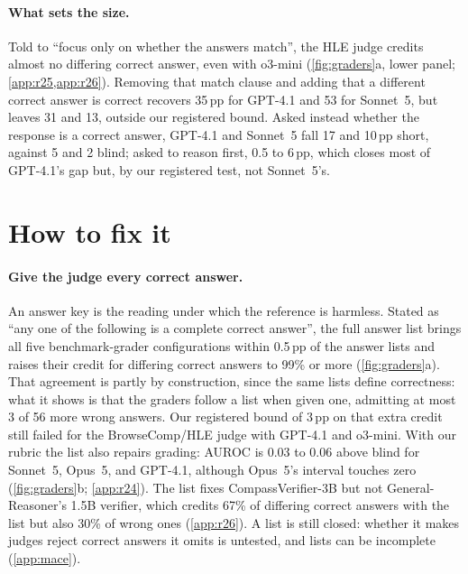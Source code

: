 \documentclass{article}
\begin{document}
\paragraph{What sets the size.}
Told to ``focus only on whether the answers match'', the HLE judge credits almost no differing correct answer, even with o3-mini (\cref{fig:graders}a, lower panel; \cref{app:r25,app:r26}).
Removing that match clause and adding that a different correct answer is correct recovers 35\,pp for GPT-4.1 and 53 for Sonnet~5, but leaves 31 and 13, outside our registered bound.
Asked instead whether the response is a correct answer, GPT-4.1 and Sonnet~5 fall 17 and 10\,pp short, against 5 and 2 blind; asked to reason first, 0.5 to 6\,pp, which closes most of GPT-4.1's gap but, by our registered test, not Sonnet~5's.

\section{How to fix it}
\label{sec:fix}

\paragraph{Give the judge every correct answer.}
An answer key is the reading under which the reference is harmless.
Stated as ``any one of the following is a complete correct answer'', the full answer list brings all five benchmark-grader configurations within 0.5\,pp of the answer lists and raises their credit for differing correct answers to 99\% or more (\cref{fig:graders}a).
That agreement is partly by construction, since the same lists define correctness: what it shows is that the graders follow a list when given one, admitting at most 3 of 56 more wrong answers.
Our registered bound of 3\,pp on that extra credit still failed for the BrowseComp/HLE judge with GPT-4.1 and o3-mini.
With our rubric the list also repairs grading: AUROC is 0.03 to 0.06 above blind for Sonnet~5, Opus~5, and GPT-4.1, although Opus~5's interval touches zero (\cref{fig:graders}b; \cref{app:r24}).
The list fixes CompassVerifier-3B but not General-Reasoner's 1.5B verifier, which credits 67\% of differing correct answers with the list but also 30\% of wrong ones (\cref{app:r26}).
A list is still closed: whether it makes judges reject correct answers it omits is untested, and lists can be incomplete (\cref{app:mace}).
\end{document}

